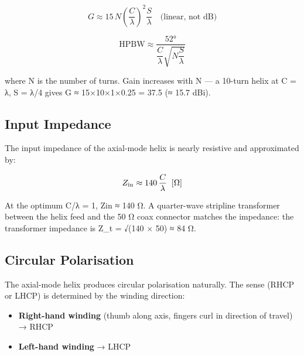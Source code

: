 				
\[G \approx 15\,N\!\left(\frac{C}{\lambda}\right)^{\!2}\!\frac{S}{\lambda} \quad \text{(linear, not dB)}\]

				
\[\text{HPBW} \approx \dfrac{52°}{\dfrac{C}{\lambda}\sqrt{N\dfrac{S}{\lambda}}}\]

				

where N is the number of turns. Gain increases with N — a 10-turn helix at C = λ, S = λ/4 gives G ≈ 15×10×1×0.25 = 37.5 (≈ 15.7 dBi).

				

\subsection{Input Impedance}

				

The input impedance of the axial-mode helix is nearly resistive and approximated by:

				
\[Z_{\rm in} \approx 140\,\dfrac{C}{\lambda}\;\;[\Omega]\]

				

At the optimum C/λ = 1, Zin ≈ 140 Ω. A quarter-wave stripline transformer between the helix feed and the 50 Ω coax connector matches the impedance: the transformer impedance is Z\_t = √(140 × 50) ≈ 84 Ω.

				


				

\subsection{Circular Polarisation}

				

The axial-mode helix produces circular polarisation naturally. The sense (RHCP or LHCP) is determined by the winding direction:

				
\begin{itemize}

					\item \textbf{Right-hand winding} (thumb along axis, fingers curl in direction of travel) → RHCP

					\item \textbf{Left-hand winding} → LHCP

				
\end{itemize}

				

